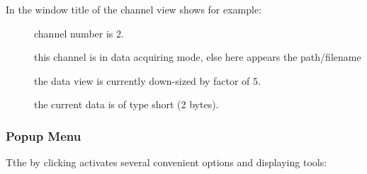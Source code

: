 In the window title of the channel view shows for example:




\begin{description}
\item[] channel number is 2.
\item[] this channel is in data acquiring mode, else here appears the path/filename
\item[] the data view is currently down-sized by factor of 5.
\item[] the current data is of type short (2 bytes).
\end{description}

\subsubsection{Popup Menu}
\label{Gxsm-TwoD-Popup}
Tthe  by clicking 
activates several convenient options and displaying tools:

